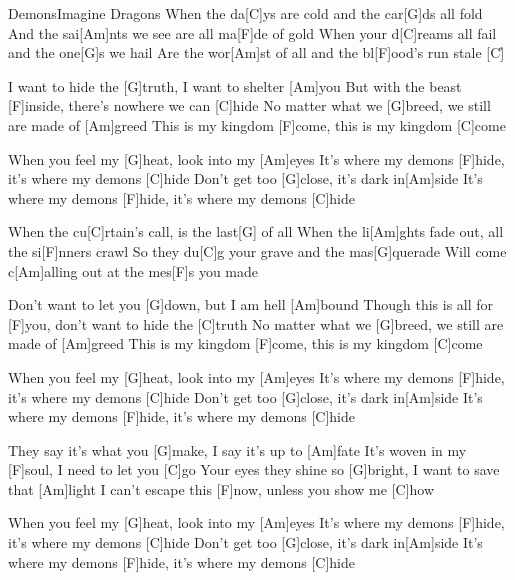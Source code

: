 \documentclass[../main.tex]{subfiles}
\begin{document}
\begin{song}[3]{Demons}{Imagine Dragons}{}
When the da[C]ys are cold and the car[G]ds all fold
And the sai[Am]nts we see are all ma[F]de of gold
When your d[C]reams all fail and the one[G]s we hail 
Are the wor[Am]st of all and the bl[F]ood's run stale [C]{\h}

I want to hide the [G]truth, I want to shelter [Am]you
But with the beast [F]inside, there's nowhere we can [C]hide
No matter what we [G]breed, we still are made of [Am]greed
This is my kingdom [F]come, this is my kingdom [C]come

When you feel my [G]heat, look into my [Am]eyes
It's where my demons [F]hide, it's where my demons [C]hide
Don't get too [G]close, it's dark in[Am]side
It's where my demons [F]hide, it's where my demons [C]hide

When the cu[C]rtain's call, is the last[G] of all
When the li[Am]ghts fade out, all the si[F]nners crawl
So they du[C]g your grave and the mas[G]querade
Will come c[Am]alling out at the mes[F]s you made

Don't want to let you [G]down, but I am hell [Am]bound
Though this is all for [F]you, don't want to hide the [C]truth
No matter what we [G]breed, we still are made of [Am]greed
This is my kingdom [F]come, this is my kingdom [C]come

When you feel my [G]heat, look into my [Am]eyes
It's where my demons [F]hide, it's where my demons [C]hide
Don't get too [G]close, it's dark in[Am]side
It's where my demons [F]hide, it's where my demons [C]hide

They say it's what you [G]make, I say it's up to [Am]fate
It's woven in my [F]soul, I need to let you [C]go
Your eyes they shine so [G]bright, I want to save that [Am]light
I can't escape this [F]now, unless you show me [C]how

When you feel my [G]heat, look into my [Am]eyes
It's where my demons [F]hide, it's where my demons [C]hide
Don't get too [G]close, it's dark in[Am]side
It's where my demons [F]hide, it's where my demons [C]hide

\end{song}
\end{document}
